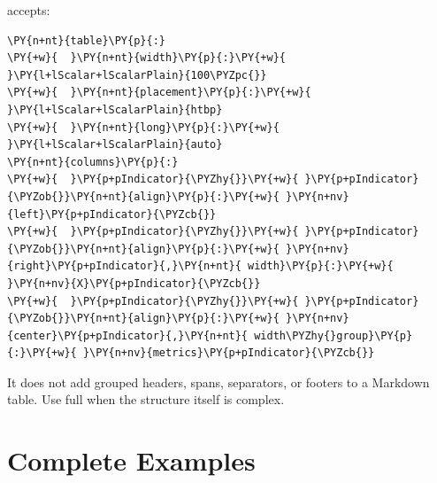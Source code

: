 \documentclass[a4paper,twoside]{article}
\begin{document}
 accepts:
\begin{tscode}[lang=yaml, engine=pygments]
\begin{Verbatim}[commandchars=\\\{\},breaklines, breakanywhere, commandchars=\\\{\}]
\PY{n+nt}{table}\PY{p}{:}
\PY{+w}{  }\PY{n+nt}{width}\PY{p}{:}\PY{+w}{ }\PY{l+lScalar+lScalarPlain}{100\PYZpc{}}
\PY{+w}{  }\PY{n+nt}{placement}\PY{p}{:}\PY{+w}{ }\PY{l+lScalar+lScalarPlain}{htbp}
\PY{+w}{  }\PY{n+nt}{long}\PY{p}{:}\PY{+w}{ }\PY{l+lScalar+lScalarPlain}{auto}
\PY{n+nt}{columns}\PY{p}{:}
\PY{+w}{  }\PY{p+pIndicator}{\PYZhy{}}\PY{+w}{ }\PY{p+pIndicator}{\PYZob{}}\PY{n+nt}{align}\PY{p}{:}\PY{+w}{ }\PY{n+nv}{left}\PY{p+pIndicator}{\PYZcb{}}
\PY{+w}{  }\PY{p+pIndicator}{\PYZhy{}}\PY{+w}{ }\PY{p+pIndicator}{\PYZob{}}\PY{n+nt}{align}\PY{p}{:}\PY{+w}{ }\PY{n+nv}{right}\PY{p+pIndicator}{,}\PY{n+nt}{ width}\PY{p}{:}\PY{+w}{ }\PY{n+nv}{X}\PY{p+pIndicator}{\PYZcb{}}
\PY{+w}{  }\PY{p+pIndicator}{\PYZhy{}}\PY{+w}{ }\PY{p+pIndicator}{\PYZob{}}\PY{n+nt}{align}\PY{p}{:}\PY{+w}{ }\PY{n+nv}{center}\PY{p+pIndicator}{,}\PY{n+nt}{ width\PYZhy{}group}\PY{p}{:}\PY{+w}{ }\PY{n+nv}{metrics}\PY{p+pIndicator}{\PYZcb{}}
\end{Verbatim}
\end{tscode}
It does not add grouped headers, spans, separators, or footers to a Markdown
table. Use full  when the structure itself is complex.
\section{Complete Examples}
\end{document}
